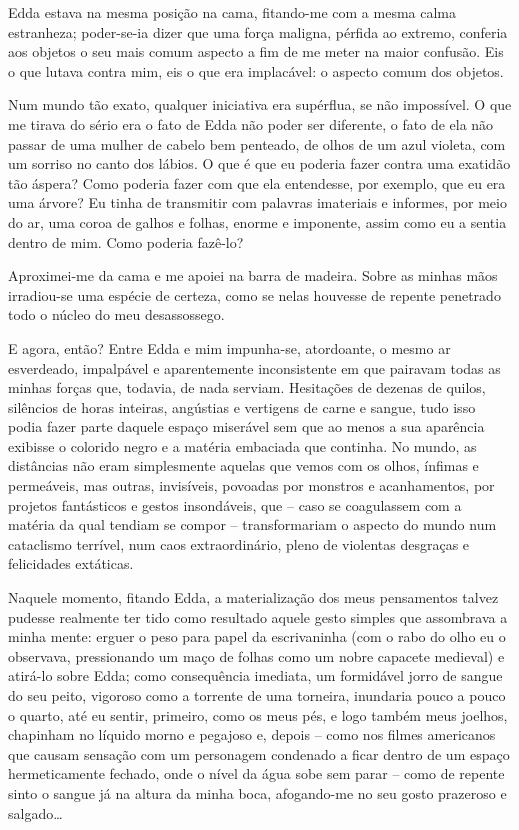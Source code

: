 Edda estava na mesma posição na cama, fitando-me com a mesma calma estranheza; poder-se-ia dizer que uma força maligna, pérfida ao extremo, conferia aos objetos o seu mais comum aspecto a fim de me meter na maior confusão. Eis o que lutava contra mim, eis o que era implacável: o aspecto comum dos objetos.

Num mundo tão exato, qualquer iniciativa era supérflua, se não impossível. O que me tirava do sério era o fato de Edda não poder ser diferente, o fato de ela não passar de uma mulher de cabelo bem penteado, de olhos de um azul violeta, com um sorriso no canto dos lábios. O que é que eu poderia fazer contra uma exatidão tão áspera? Como poderia fazer com que ela entendesse, por exemplo, que eu era uma árvore? Eu tinha de transmitir com palavras imateriais e informes, por meio do ar, uma coroa de galhos e folhas, enorme e imponente, assim como eu a sentia dentro de mim. Como poderia fazê-lo?

Aproximei-me da cama e me apoiei na barra de madeira. Sobre as minhas mãos irradiou-se uma espécie de certeza, como se nelas houvesse de repente penetrado todo o núcleo do meu desassossego.

E agora, então? Entre Edda e mim impunha-se, atordoante, o mesmo ar esverdeado, impalpável e aparentemente inconsistente em que pairavam todas as minhas forças que, todavia, de nada serviam. Hesitações de dezenas de quilos, silêncios de horas inteiras, angústias e vertigens de carne e sangue, tudo isso podia fazer parte daquele espaço miserável sem que ao menos a sua aparência exibisse o colorido negro e a matéria embaciada que continha. No mundo, as distâncias não eram simplesmente aquelas que vemos com os olhos, ínfimas e permeáveis, mas outras, invisíveis, povoadas por monstros e acanhamentos, por projetos fantásticos e gestos insondáveis, que -- caso se coagulassem com a matéria da qual tendiam se compor -- transformariam o aspecto do mundo num cataclismo terrível, num caos extraordinário, pleno de violentas desgraças e felicidades extáticas.

Naquele momento, fitando Edda, a materialização dos meus pensamentos talvez pudesse realmente ter tido como resultado aquele gesto simples que assombrava a minha mente: erguer o peso para papel da escrivaninha (com o rabo do olho eu o observava, pressionando um maço de folhas como um nobre capacete medieval) e atirá-lo sobre Edda; como consequência imediata, um formidável jorro de sangue do seu peito, vigoroso como a torrente de uma torneira, inundaria pouco a pouco o quarto, até eu sentir, primeiro, como os meus pés, e logo também meus joelhos, chapinham no líquido morno e pegajoso e, depois -- como nos filmes americanos que causam sensação com um personagem condenado a ficar dentro de um espaço hermeticamente fechado, onde o nível da água sobe sem parar -- como de repente sinto o sangue já na altura da minha boca, afogando-me no seu gosto prazeroso e salgado\dots

